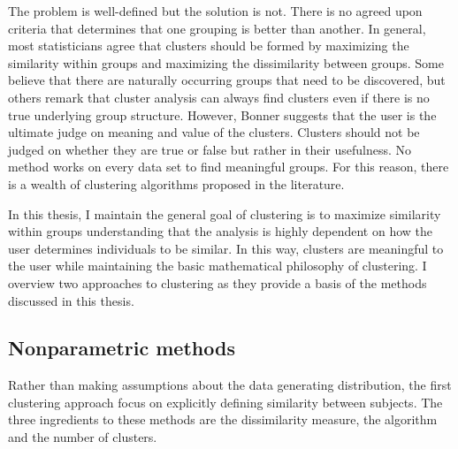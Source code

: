 The problem is well-defined but the solution is not. There is no agreed upon criteria that determines that one grouping is better than another. In general, most statisticians agree that clusters should be formed by maximizing the similarity within groups and maximizing the dissimilarity between groups. Some believe that there are naturally occurring groups that need to be discovered, but others remark that cluster analysis can always find clusters even if there is no true underlying group structure. However, Bonner \cite{bonner1964} suggests that the user is the ultimate judge on meaning and value of the clusters. Clusters should not be judged on whether they are true or false but rather in their usefulness. No method works on every data set to find meaningful groups. For this reason, there is a wealth of clustering algorithms proposed in the literature. 

In this thesis, I maintain the general goal of clustering is to maximize similarity within groups understanding that the analysis is highly dependent on how the user determines individuals to be similar. In this way, clusters are meaningful to the user while maintaining the basic mathematical philosophy of clustering.  I overview two approaches to clustering as they provide a basis of the methods discussed in this thesis. 

\subsection{Nonparametric methods}
Rather than making assumptions about the data generating distribution, the first clustering approach focus on explicitly defining similarity between subjects. The three ingredients to these methods are the dissimilarity measure, the algorithm and the number of clusters.

